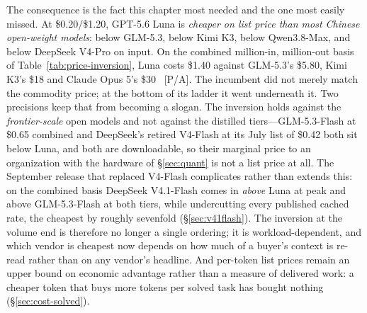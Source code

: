 The consequence is the fact this chapter most needed and the one most easily missed. At \$0.20/\$1.20, GPT-5.6 Luna is \emph{cheaper on list price than most Chinese open-weight models}: below GLM-5.3, below Kimi K3, below Qwen3.8-Max, and below DeepSeek V4-Pro on input. On the combined million-in, million-out basis of Table~\ref{tab:price-inversion}, Luna costs \$1.40 against GLM-5.3's \$5.80, Kimi K3's \$18 and Claude Opus 5's \$30~\cite{price-inversion} [P/A]. The incumbent did not merely match the commodity price; at the bottom of its ladder it went underneath it. Two precisions keep that from becoming a slogan. The inversion holds against the \emph{frontier-scale} open models and not against the distilled tiers---GLM-5.3-Flash at \$0.65 combined and DeepSeek's retired V4-Flash at its July list of \$0.42 both sit below Luna, and both are downloadable, so their marginal price to an organization with the hardware of \S\ref{sec:quant} is not a list price at all. The September release that replaced V4-Flash complicates rather than extends this: on the combined basis DeepSeek V4.1-Flash comes in \emph{above} Luna at peak and above GLM-5.3-Flash at both tiers, while undercutting every published cached rate, the cheapest by roughly sevenfold (\S\ref{sec:v41flash}). The inversion at the volume end is therefore no longer a single ordering; it is workload-dependent, and which vendor is cheapest now depends on how much of a buyer's context is re-read rather than on any vendor's headline. And per-token list prices remain an upper bound on economic advantage rather than a measure of delivered work: a cheaper token that buys more tokens per solved task has bought nothing (\S\ref{sec:cost-solved}).

